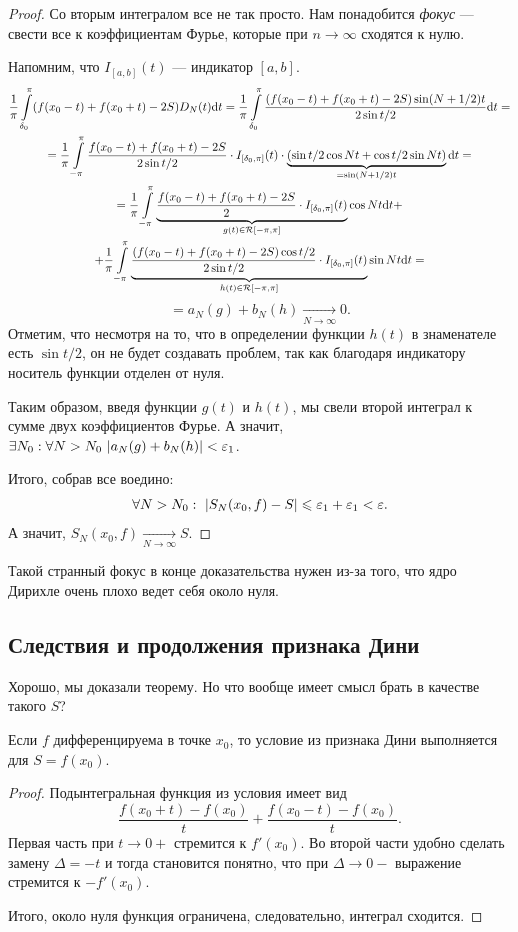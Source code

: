\begin{proof}
Со вторым интегралом все не так просто. Нам понадобится \textit{фокус} --- свести все к коэффициентам Фурье, которые при $n\to \infty$ сходятся к нулю.

Напомним, что $I_{[a, b]}(t)$ --- индикатор $[a, b]$.
\begin{multline}
\dfrac{1}{\pi} \int\limits_{\delta_0}^{\pi} (f(x_0 - t) + f(x_0 + t) - 2S)D_N(t)\mathrm{d} t =  \dfrac{1}{\pi} \int\limits_{\delta_0}^{\pi} \dfrac{(f(x_0 - t) + f(x_0 + t) - 2S) \sin (N + 1/2)t}{2 \sin t/2} \mathrm{d} t = \\ 
= \dfrac{1}{\pi} \int\limits_{-\pi}^{\pi} \dfrac{f(x_0 - t) + f(x_0 + t) - 2S}{2 \sin t/2} \cdot I_{[\delta_0, \pi]}(t) \cdot \underbrace{(\sin t/2 \cos Nt + \cos t/2 \sin Nt)}_{=\sin(N + 1/2)t}\mathrm{d} t =
\\
= \dfrac{1}{\pi} \int\limits_{-\pi}^{\pi} \underbrace{\dfrac{f(x_0 - t) + f(x_0 + t) - 2S}{2} \cdot I_{[\delta_0, \pi]}(t)}_{g(t) \in \mathcal{R}[-\pi, \pi]} \cos Nt \mathrm{d} t + \\ + \dfrac{1}{\pi} \int\limits_{-\pi}^{\pi} \underbrace{\dfrac{(f(x_0 - t) + f(x_0 + t) - 2S)\cos t/2}{2\sin t/2} \cdot I_{[\delta_0, \pi]}(t)}_{h(t) \in \mathcal{R}[-\pi, \pi]} \sin Nt \mathrm{d} t =
\end{multline}
$$
= a_N(g) + b_N(h) \underset{N\to \infty}{\longrightarrow} 0.
$$
Отметим, что несмотря на то, что в определении функции $h(t)$ в знаменателе есть $\sin t/2$, он не будет создавать проблем, так как благодаря индикатору носитель функции отделен от нуля.

Таким образом, введя функции $g(t)$ и $h(t)$, мы свели второй интеграл к сумме двух коэффициентов Фурье. А значит, $\exists N_0: \forall N > N_0\ |a_N(g) + b_N(h)| < \varepsilon_1$.

Итого, собрав все воедино:
\begin{gather*}
\forall N> N_0: \ |S_N(x_0, f) - S| \leqslant \varepsilon_1 + \varepsilon_1 < \varepsilon.
\end{gather*}
А значит, $S_N(x_0, f) \underset{N\to \infty}{\longrightarrow} S$.
\end{proof}
\begin{Comment}
Такой странный фокус в конце доказательства нужен из-за того, что ядро Дирихле очень плохо ведет себя около нуля.
\end{Comment}
\subsection{Следствия и продолжения признака Дини}
Хорошо, мы доказали теорему. Но что вообще имеет смысл брать в качестве такого $S$?
\begin{Comment}
Если $f$ дифференцируема в точке $x_0$, то условие из признака Дини выполняется для $S = f(x_0)$.
\end{Comment}
\begin{proof}
Подынтегральная функция из условия имеет вид 
$$
\dfrac{f(x_0 + t) - f(x_0)}{t} + \dfrac{f(x_0 - t) - f(x_0)}{t}.
$$
Первая часть при $t \to 0+$ стремится к $f'(x_0)$. Во второй части удобно сделать замену $\Delta = -t$ и тогда становится понятно, что при $\Delta \to 0-$ выражение стремится к $-f'(x_0)$.

Итого, около нуля функция ограничена, следовательно, интеграл сходится.
\end{proof}

